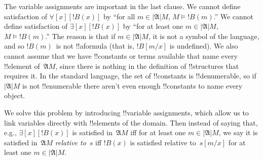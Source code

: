 \documentclass[10pt,a4paper]{article}
\makeatletter
\theoremstyle{plain}
\theoremstyle{definition}
\theoremstyle{remark}
\newenvironment{explain}{}{}
\providecommand{\lforall}{\mathord{\forall}}
\providecommand{\lexists}{\mathord{\exists}}
\providecommand{\Subst}[3]{#1[#2/#3]}
\providecommand{\Struct}{\ensuremath{\mathfrak{A}}}
\providecommand{\Domain}{\ensuremath{|\mathfrak{A}|}}
\providecommand{\Sat}[2]{\ensuremath{#1 \models #2}}
\providecommand{\iftag}[1]{#1}
\providecommand{\iftag}{}
\def\iftag#1#2#3{\iftag@stop{#2}\iftag@more}
\def\iftag@more{\@ifnextchar\bgroup{\iftag@eat}{\relax}}
\def\iftag@eat#1{}
\def\iftag@stop#1{#1}
\makeatother
\begin{document}
\begin{explain}
The variable assignments are important in the last
\iftag{notprvEx,notprvAll}{clause}{two clauses}.\iftag{prvAll}{ We
cannot define satisfaction of $\lforall[x][!B(x)]$ by ``for all $m \in
\Domain{M}$, $\Sat{M}{!B(m)}$.''}{}\iftag{prvEx}{ We cannot define
satisfaction of $\lexists[x][!B(x)]$ by ``for at least one $m \in
\Domain{M}$, $\Sat{M}{!B(m)}$.''}{} The reason is that if $m \in
\Domain M$, it is not a symbol of the language, and so $!B(m)$~is not
!!a{formula} (that is, $\Subst{!B}{m}{x}$ is undefined).  We also
cannot assume that we have !!{constant}s or terms available that name
every !!{element} of~$\Struct{M}$, since there is nothing in the
definition of !!{structure}s that requires it.  In the standard
language, the set of !!{constant}s is !!{denumerable}, so if
$\Domain{M}$ is not !!{enumerable} there aren't even enough
!!{constant}s to name every object. 

We solve this problem by introducing !!{variable} assignments, which
allow us to link variables directly with !!{element}s of the domain.
Then instead of saying that, e.g.,
\iftag{prvEx}{$\lexists[x][!B(x)]$}{$\lforall[x][!B(x)]$} is satisfied
in~$\Struct M$ iff \iftag{prvEx}{for at least one $m \in
\Domain{M}$}{for all $m \in \Domain{M}$, $\Sat{M}{!B(m)}$}, we say it
is satisfied in~$\Struct M$ \emph{relative to}~$s$ iff $!B(x)$ is
satisfied relative to~$\Subst{s}{m}{x}$ \iftag{prvEx}{for at least
one}{for every} $m \in \Domain M$.
\end{explain}
\end{document}
